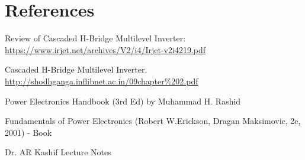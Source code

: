 \documentclass[a4paper, 11pt, oneside]{report}
\begin{document}
\chapter*{References} 
\begin{enumerate}[ {[}1{]} ]

\item Review of Cascaded H-Bridge Multilevel Inverter:  \url{https://www.irjet.net/archives/V2/i4/Irjet-v2i4219.pdf}

\item Cascaded H-Bridge Multilevel Inverter.
 \url{ http://shodhganga.inflibnet.ac.in/09chapter%202.pdf}

\item  Power Electronics Handbook (3rd Ed) by Muhammad H. Rashid

\item  Fundamentals of Power Electronics (Robert W.Erickson, Dragan Maksimovic, 2e, 2001) - Book

\item Dr. AR Kashif Lecture Notes


\end{enumerate}
\end{document}
